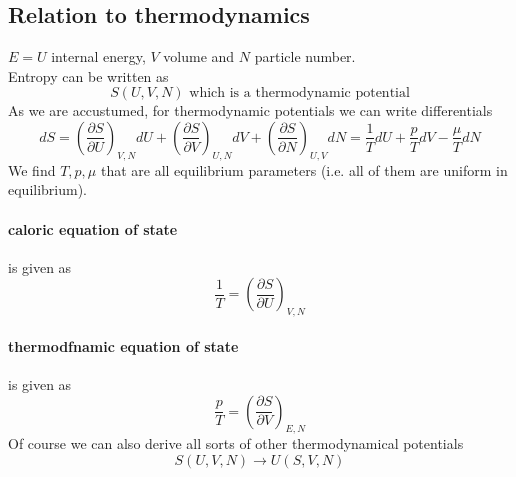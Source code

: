 \documentclass{report}
\begin{document}
\subsection{Relation to thermodynamics}
$E = U$ internal energy, $V$ volume and $N$ particle number.\\
Entropy can be written as \[
  S\left( U,V,N \right) \text{ which is a thermodynamic potential}
\] 
As we are accustumed, for thermodynamic potentials we can write differentials \[
  dS = \left( \frac{\partial S }{\partial U } \right) _{V,N} dU + \left( \frac{\partial S }{\partial V } \right) _{U,N} dV + \left( \frac{\partial S }{\partial N } \right) _{U,V} dN = \frac{1}{T} dU + \frac{p}{T} dV - \frac{\mu}{T} dN
\] We find $T, p, \mu$ that are all equilibrium parameters (i.e. all of them are uniform in equilibrium).\\
\paragraph{caloric equation of state} is given as \[
  \frac{1}{T} = \left( \frac{\partial S }{\partial U } \right) _{V,N}
\] 
\paragraph{thermodfnamic equation of state} is given as \[
  \frac{p}{T} = \left( \frac{\partial S }{\partial V } \right) _{E,N}
\] 
Of course we can also derive all sorts of other thermodynamical potentials \[
  S\left( U,V,N \right) \to U\left( S,V,N \right) 
\] 
\end{document}
